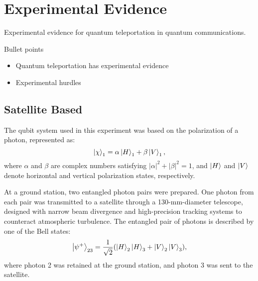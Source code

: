 \section{Experimental Evidence}
Experimental evidence for quantum teleportation in quantum communications.
\begin{mybox}{Bullet points}
    \begin{itemize}
        \item Quantum teleportation has experimental evidence
        \item Experimental hurdles
    \end{itemize}
\end{mybox}
\subsection{Satellite Based}


The qubit system used in this experiment was based on the polarization of a photon, represented as:  
\begin{equation}
    \ket{\chi}_1 = \alpha\ket{H}_1 + \beta\ket{V}_1,
\end{equation}
where \(\alpha\) and \(\beta\) are complex numbers satisfying \(|\alpha|^2 + |\beta|^2 = 1\), and \(\ket{H}\) and \(\ket{V}\) denote 
horizontal and vertical polarization states, respectively.  

At a ground station, two entangled photon pairs were prepared. One photon from each pair was transmitted to a satellite through a 
130-mm-diameter telescope, designed with narrow beam divergence and high-precision tracking systems to counteract atmospheric turbulence. 
The entangled pair of photons is described by one of the Bell states:
\begin{equation}
    \ket{\psi^{+}}_{23} = \frac{1}{\sqrt{2}} (\ket{H}_2\ket{H}_3 + \ket{V}_2\ket{V}_3),
\end{equation}
where photon 2 was retained at the ground station, and photon 3 was sent to the satellite.

